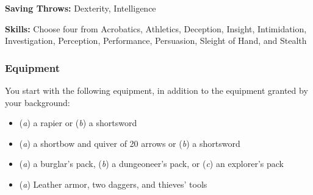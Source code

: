 \textbf{Saving Throws:} Dexterity, Intelligence

\textbf{Skills:} Choose four from Acrobatics, Athletics, Deception, Insight, Intimidation, Investigation, Perception, Performance, Persuasion, Sleight of Hand, and Stealth

\subsubsection{Equipment}

You start with the following equipment, in addition to the equipment granted by your background:
\begin{itemize}
	\item (\textit{a}) a rapier or (\textit{b}) a shortsword
	\item (\textit{a}) a shortbow and quiver of 20 arrows or (\textit{b}) a shortsword
	\item (\textit{a}) a burglar's pack, (\textit{b}) a dungeoneer's pack, or (\textit{c}) an explorer's pack
  \item (\textit{a}) Leather armor, two daggers, and thieves' tools
\end{itemize}


